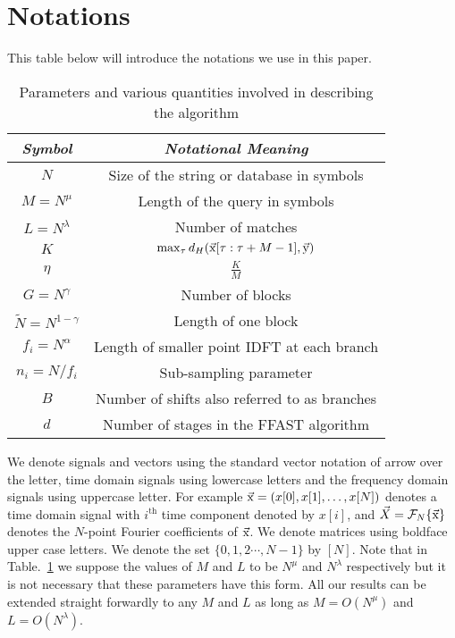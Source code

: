 \section{Notations}

This table below will introduce the notations we use in this paper.
\begin{table}[h!]
\label{Table:Notations}
\caption{Parameters and various quantities involved in describing the algorithm}
\begin{center}
	\begin{tabular}{|c|c|} 	
		\hline		
		\textit{Symbol}				        &  \textit{Notational Meaning} \\		
		\hline
		$N$           				& Size of the string or database in symbols \\
		\hline
		$M = N^{\mu}$       & Length of the query in symbols \\
		\hline
        $L = N^\lambda$    &   Number of matches \\
        \hline
        $K$             &$\max_{\tau}d_{H}(\vec{\mathrm{x}}[\tau:\tau+M-1],\vec{\mathrm{y}})$\\
        \hline
	    $\eta$             &$\frac{K}{M}$\\
	    \hline
		$G = N^\gamma$    & Number of blocks \\
		\hline
		$\tilde{N} = N^{1-\gamma}$   & Length of one block \\
		\hline
		$f_i = N^\alpha$     & Length of smaller point IDFT at each branch\\
		\hline
		$n_i = N/f_i$     	   &  Sub-sampling parameter \\
		\hline
		$B$   					    & Number of shifts also referred to as branches  \\
		\hline
		$d$           				& Number of stages in the FFAST algorithm \\
		\hline
	\end{tabular}
\end{center}	
\end{table}	
We denote signals and vectors using the standard vector notation of arrow over the letter, time domain signals using lowercase letters and the frequency domain signals using uppercase letter. For example $\vec{\mathrm{x}} = (x[0], x[1], \ldots, x[N] )$ denotes a time domain signal with $i^{\text{th}}$ time component denoted by $x[i]$, and $\vec{X}= \mathcal{F}_{N}\{\vec{\mathrm{x}}\}$ denotes the $N$-point Fourier coefficients of $\vec{\mathrm{x}}$. We denote matrices using boldface upper case letters. We denote the set $\{0,1,2\cdots, N-1\}$ by $[N]$. Note that in Table.~\ref{Table:Notations} we suppose the values of $M$ and $L$ to be $N^{\mu}$ and $N^{\lambda}$ respectively but it is not necessary that these parameters have this form. All our results can be extended straight forwardly to any $M$ and $L$ as long as $M=O(N^{\mu})$ and $L=O(N^{\lambda})$.
	
	


